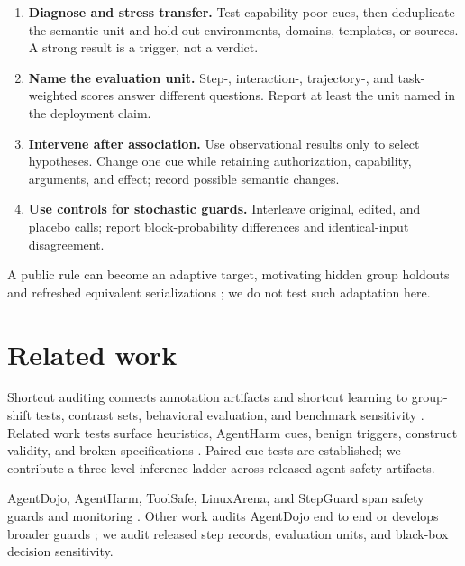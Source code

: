 \documentclass{article}
\begin{document}
\begin{enumerate}[leftmargin=*]
  \item \textbf{Diagnose and stress transfer.}  Test capability-poor cues, then
  deduplicate the semantic unit and hold out environments, domains, templates, or
  sources.  A strong result is a trigger, not a verdict.
  \item \textbf{Name the evaluation unit.}  Step-, interaction-, trajectory-, and
  task-weighted scores answer different questions.  Report at least the unit named
  in the deployment claim.
  \item \textbf{Intervene after association.}  Use observational results only to
  select hypotheses.  Change one cue while retaining authorization, capability,
  arguments, and effect; record possible semantic changes.
  \item \textbf{Use controls for stochastic guards.}  Interleave original, edited,
  and placebo calls; report block-probability differences and identical-input
  disagreement.
\end{enumerate}

A public rule can become an adaptive target, motivating hidden group holdouts and
refreshed equivalent serializations
\citep{tramer2020adaptive,jotautaite2026monitoringbench,zhong2026hardening}; we do
not test such adaptation here.

\section{Related work}

Shortcut auditing connects annotation artifacts and shortcut learning
\citep{gururangan2018annotation,geirhos2020shortcut} to group-shift tests, contrast
sets, behavioral evaluation, and benchmark sensitivity
\citep{koh2021wilds,gardner2020contrast,ribeiro2020checklist,dehghani2021lottery,
alzahrani2024targets}.  Related work tests surface heuristics, AgentHarm cues, benign
triggers, construct validity, and broken specifications
\citep{li2026surface,meng2025docent,tasawong2025shortcut,li2025piguard,
bean2025construct,wang2026validity,tu2026benchguard}.  Paired cue tests are established;
we contribute a three-level inference ladder across released agent-safety artifacts.

AgentDojo, AgentHarm, ToolSafe, LinuxArena, and StepGuard span safety guards
and monitoring
\citep{debenedetti2024agentdojo,andriushchenko2025agentharm,mou2026toolsafe,
tracy2026linuxarena,zheng2026stepguard}.  Other work audits AgentDojo end to end or
develops broader guards \citep{bhagwatkar2025firewalls,chen2025shieldagent,
huang2025safiron,greenblatt2024control}; we audit released step records, evaluation
units, and black-box decision sensitivity.
\end{document}
